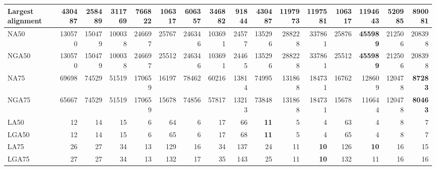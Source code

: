 \documentclass[12pt,a4paper]{article}
\begin{document}
\begin{table}[ht]
\begin{center}
\begin{tabular}{|l*{15}{|r}|}
Largest alignment & 430487 & 258489 & 311769 & 766822 & 106317 & 606357 & 346882 & {\bf 91844} & 430487 & 1197973 & 1197581 & 106317 & 1194643 & 520985 & 890081 \\ \hline
NA50 & 130570 & 150479 & 100038 & 246697 & 25767 & 246346 & 103691 & 24577 & 135296 & 288228 & 337861 & 25876 & {\bf 455989} & 212506 & 208398 \\ \hline
NGA50 & 130570 & 150479 & 100038 & 246697 & 25512 & 246346 & 103691 & 24465 & 135296 & 288228 & 337861 & 25512 & {\bf 455989} & 212506 & 208398 \\ \hline
NA75 & 69698 & 74529 & 51519 & 170659 & 16197 & 78462 & 60216 & 13814 & 74995 & 131868 & 184731 & 16762 & 128609 & 120478 & {\bf 87283} \\ \hline
NGA75 & 65667 & 74529 & 51519 & 170659 & 15678 & 74856 & 57817 & 13213 & 73848 & 131868 & 184731 & 15678 & 116644 & 120478 & {\bf 80463} \\ \hline
LA50 & 12 & 14 & 15 & 6 & 64 & 6 & 17 & 66 & {\bf 11} & 5 & 4 & 63 & 4 & 8 & 7 \\ \hline
LGA50 & 12 & 14 & 15 & 6 & 65 & 6 & 17 & 68 & {\bf 11} & 5 & 4 & 65 & 4 & 8 & 7 \\ \hline
LA75 & 26 & 27 & 34 & 13 & 129 & 16 & 34 & 137 & 24 & 11 & {\bf 10} & 126 & {\bf 10} & 16 & 15 \\ \hline
LGA75 & 27 & 27 & 34 & 13 & 132 & 17 & 35 & 143 & 25 & 11 & {\bf 10} & 132 & 11 & 16 & 16 \\ \hline
\end{tabular}
\end{center}
\end{table}
\end{document}
